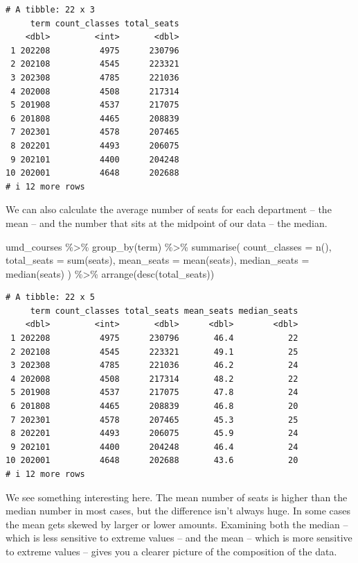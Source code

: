 \documentclass[
  letterpaper,
  DIV=11,
  numbers=noendperiod]{scrreprt}
\newenvironment{Shaded}{\begin{snugshade}}{\end{snugshade}}
\newcommand{\AttributeTok}[1]{\textcolor[rgb]{0.40,0.45,0.13}{#1}}
\newcommand{\FunctionTok}[1]{\textcolor[rgb]{0.28,0.35,0.67}{#1}}
\newcommand{\NormalTok}[1]{\textcolor[rgb]{0.00,0.23,0.31}{#1}}
\newcommand{\SpecialCharTok}[1]{\textcolor[rgb]{0.37,0.37,0.37}{#1}}
\begin{document}
\begin{verbatim}
# A tibble: 22 x 3
     term count_classes total_seats
    <dbl>         <int>       <dbl>
 1 202208          4975      230796
 2 202108          4545      223321
 3 202308          4785      221036
 4 202008          4508      217314
 5 201908          4537      217075
 6 201808          4465      208839
 7 202301          4578      207465
 8 202201          4493      206075
 9 202101          4400      204248
10 202001          4648      202688
# i 12 more rows
\end{verbatim}

We can also calculate the average number of seats for each department --
the mean -- and the number that sits at the midpoint of our data -- the
median.

\begin{Shaded}
\begin{Highlighting}[]
\NormalTok{umd\_courses }\SpecialCharTok{\%\textgreater{}\%}
  \FunctionTok{group\_by}\NormalTok{(term) }\SpecialCharTok{\%\textgreater{}\%}
  \FunctionTok{summarise}\NormalTok{(}
    \AttributeTok{count\_classes =} \FunctionTok{n}\NormalTok{(),}
    \AttributeTok{total\_seats =} \FunctionTok{sum}\NormalTok{(seats),}
    \AttributeTok{mean\_seats =} \FunctionTok{mean}\NormalTok{(seats),}
    \AttributeTok{median\_seats =} \FunctionTok{median}\NormalTok{(seats)}
\NormalTok{  ) }\SpecialCharTok{\%\textgreater{}\%}
  \FunctionTok{arrange}\NormalTok{(}\FunctionTok{desc}\NormalTok{(total\_seats))}
\end{Highlighting}
\end{Shaded}

\begin{verbatim}
# A tibble: 22 x 5
     term count_classes total_seats mean_seats median_seats
    <dbl>         <int>       <dbl>      <dbl>        <dbl>
 1 202208          4975      230796       46.4           22
 2 202108          4545      223321       49.1           25
 3 202308          4785      221036       46.2           24
 4 202008          4508      217314       48.2           22
 5 201908          4537      217075       47.8           24
 6 201808          4465      208839       46.8           20
 7 202301          4578      207465       45.3           25
 8 202201          4493      206075       45.9           24
 9 202101          4400      204248       46.4           24
10 202001          4648      202688       43.6           20
# i 12 more rows
\end{verbatim}

We see something interesting here. The mean number of seats is higher
than the median number in most cases, but the difference isn't always
huge. In some cases the mean gets skewed by larger or lower amounts.
Examining both the median -- which is less sensitive to extreme values
-- and the mean -- which is more sensitive to extreme values -- gives
you a clearer picture of the composition of the data.
\end{document}
